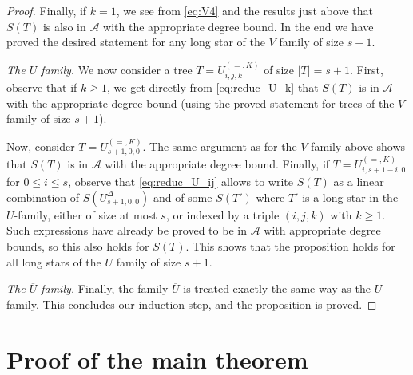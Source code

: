 \documentclass[12pt]{amsart}
\theoremstyle{plain}
\theoremstyle{remark}
\def\cA{\mathcal{A}}
\begin{document}
\begin{proof}
Finally, if $k=1$, we see from \eqref{eq:V4} and the results just above 
that $S(T)$ is also in $\cA$
with the appropriate degree bound.
In the end we have proved the desired statement for any long star of the $V$ family of size $s+1$.
\medskip

\emph{The $U$ family.}
We now consider a tree $T=U^{(=,K)}_{i,j,k}$ of size $|T|=s+1$. 
First, observe that if $k \geq 1$, we get directly from \eqref{eq:reduc_U_k} 
that $S(T)$ is in $\cA$
with the appropriate degree bound (using the proved statement for trees 
of the $V$ family of size $s+1$).

Now, consider $T=U^{(=,K)}_{s+1,0,0}$. 
The same argument as for the $V$ family above shows 
that $S(T)$ is in $\cA$ with the appropriate degree bound. 
Finally, if $T=U^{(=,K)}_{i,s+1-i,0}$ for $0 \leq i \leq s$, observe that \eqref{eq:reduc_U_ij} allows to write $S(T)$ as a linear combination of $S(U^{\Delta}_{s+1,0,0})$ and of some $S(T')$ where $T'$ is a long star in the $U$-family, either of size at most $s$,
or indexed by a triple $(i,j,k)$ with $k \ge 1$. Such expressions have already be proved to be in $\cA$ with appropriate degree bounds,
so this also holds for $S(T)$.
This shows that the proposition holds for all long stars of the $U$ family of size $s+1$.
\medskip

\emph{The $\overline{U}$ family.}
Finally, the family $\overline{U}$ is treated exactly the same way as the $U$ family.
This concludes our induction step, and the proposition is proved.
\end{proof}

\section{Proof of the main theorem}
\label{sec:proof_main_theorem}
\end{document}
